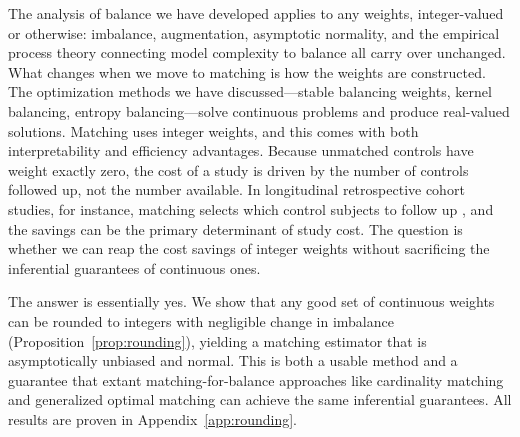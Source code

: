 \documentclass{article}
\theoremstyle{definition}
\newcommand{\<}{\langle}
\renewcommand{\>}{\rangle}
\begin{document}

The analysis of balance we have developed applies to any weights, integer-valued or otherwise: imbalance, augmentation, asymptotic normality, and the empirical process theory connecting model complexity to balance all carry over unchanged. What changes when we move to matching is how the weights are constructed. The optimization methods we have discussed---stable balancing weights, kernel balancing, entropy balancing---solve continuous problems and produce real-valued solutions. Matching uses integer weights, and this comes with both interpretability and efficiency advantages. Because unmatched controls have weight exactly zero, the cost of a study is driven by the number of controls followed up, not the number available. In longitudinal retrospective cohort studies, for instance, matching selects which control subjects to follow up \citep{stuart2008best}, and the savings can be the primary determinant of study cost. The question is whether we can reap the cost savings of integer weights without sacrificing the inferential guarantees of continuous ones.

The answer is essentially yes. We show that any good set of continuous weights can be rounded to integers with negligible change in imbalance (Proposition~\ref{prop:rounding}), yielding a matching estimator that is asymptotically unbiased and normal. This is both a usable method and a guarantee that extant matching-for-balance approaches like cardinality matching \citep{zubizarreta2014matching} and generalized optimal matching \citep{kallus2020generalized} can achieve the same inferential guarantees. All results are proven in Appendix~\ref{app:rounding}.
\end{document}
